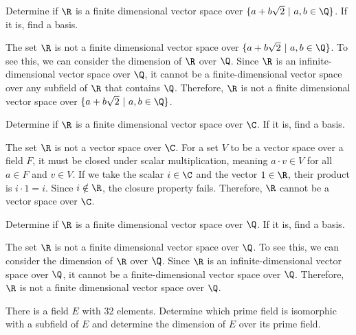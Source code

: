\begin{problem}[33.7]
  Determine if $\R$ is a finite dimensional vector space over $\{a + b\sqrt{2}~|~a, b \in \Q\}$. If it is, find a basis.
\end{problem}

\begin{solution}
  The set $\R$ is not a finite dimensional vector space over $\{a + b\sqrt{2}~|~a, b \in \Q\}$. To see this, we can consider the dimension of $\R$ over $\Q$. Since $\R$ is an infinite-dimensional vector space over $\Q$, it cannot be a finite-dimensional vector space over any subfield of $\R$ that contains $\Q$. Therefore, $\R$ is not a finite dimensional vector space over $\{a + b\sqrt{2}~|~a, b \in \Q\}$.
\end{solution}

\begin{problem}[33.8]
  Determine if $\R$ is a finite dimensional vector space over $\C$. If it is, find a basis.
\end{problem}

\begin{solution}
  The set $\R$ is not a vector space over $\C$. For a set $V$ to be a vector space over a field $F$, it must be closed under scalar multiplication, meaning $a \cdot v \in V$ for all $a \in F$ and $v \in V$. If we take the scalar $i \in \C$ and the vector $1 \in \R$, their product is $i \cdot 1 = i$. Since $i \notin \R$, the closure property fails. Therefore, $\R$ cannot be a vector space over $\C$.
\end{solution}

\begin{problem}[33.9]
  Determine if $\R$ is a finite dimensional vector space over $\Q$. If it is, find a basis.
\end{problem}

\begin{solution}
  The set $\R$ is not a finite dimensional vector space over $\Q$. To see this, we can consider the dimension of $\R$ over $\Q$. Since $\R$ is an infinite-dimensional vector space over $\Q$, it cannot be a finite-dimensional vector space over $\Q$. Therefore, $\R$ is not a finite dimensional vector space over $\Q$.
\end{solution}

\begin{problem}[33.10]
  There is a field $E$ with 32 elements. Determine which prime field is isomorphic with a subfield of $E$ and determine the dimension of $E$ over its prime field.
\end{problem}

